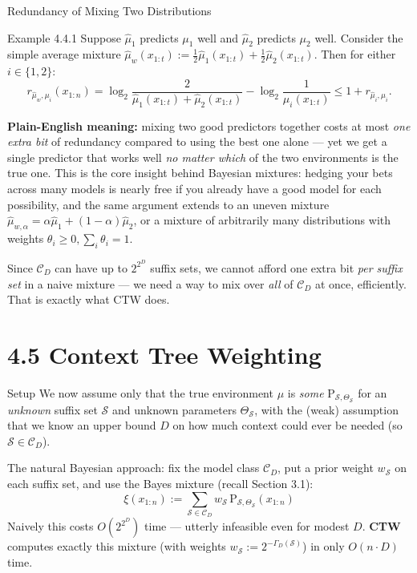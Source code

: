 \documentclass[aspectratio=169,10pt]{beamer}
\begin{document}
\begin{frame}{Redundancy of Mixing Two Distributions}
\begin{exampleblock}{Example 4.4.1}
Suppose $\hat\mu_1$ predicts $\mu_1$ well and $\hat\mu_2$ predicts $\mu_2$ well. Consider
the simple average mixture $\hat\mu_w(x_{1:t}):=\tfrac12\hat\mu_1(x_{1:t})+\tfrac12\hat\mu_2(x_{1:t})$.
Then for either $i\in\{1,2\}$:
$$
r_{\hat\mu_w,\mu_i}(x_{1:n}) = \log_2\frac{2}{\hat\mu_1(x_{1:t})+\hat\mu_2(x_{1:t})} -
\log_2\frac{1}{\mu_i(x_{1:t})} \le 1 + r_{\hat\mu_i,\mu_i}.
$$
\end{exampleblock}
\textbf{Plain-English meaning:} mixing two good predictors together costs at most \emph{one
extra bit} of redundancy compared to using the best one alone — yet we get a single
predictor that works well \emph{no matter which} of the two environments is the true one.
This is the core insight behind Bayesian mixtures: hedging your bets across many models is
nearly free if you already have a good model for each possibility, and the same argument
extends to an uneven mixture $\hat\mu_{w,\alpha}=\alpha\hat\mu_1+(1-\alpha)\hat\mu_2$, or a
mixture of arbitrarily many distributions with weights $\theta_i\ge0,\sum_i\theta_i=1$.

\vspace{0.2cm}
Since $\mathcal C_D$ can have up to $2^{2^D}$ suffix sets, we cannot afford one extra bit
\emph{per suffix set} in a naive mixture — we need a way to mix over \emph{all} of
$\mathcal C_D$ at once, efficiently. That is exactly what CTW does.
\end{frame}

\section{4.5 Context Tree Weighting}

\begin{frame}{Setup}
We now assume only that the true environment $\mu$ is \emph{some} $\mathrm{P}_{\mathcal
S,\Theta_{\mathcal S}}$ for an \emph{unknown} suffix set $\mathcal S$ and unknown parameters
$\Theta_{\mathcal S}$, with the (weak) assumption that we know an upper bound $D$ on how
much context could ever be needed (so $\mathcal S\in\mathcal C_D$).

The natural Bayesian approach: fix the model class $\mathcal C_D$, put a prior weight
$w_{\mathcal S}$ on each suffix set, and use the Bayes mixture (recall Section 3.1):
$$
\xi(x_{1:n}) := \sum_{\mathcal S\in\mathcal C_D} w_{\mathcal S}\,\mathrm{P}_{\mathcal
S,\Theta_{\mathcal S}}(x_{1:n})
$$
Naively this costs $O(2^{2^D})$ time — utterly infeasible even for modest $D$. \textbf{CTW}
computes exactly this mixture (with weights $w_{\mathcal S}:=2^{-\Gamma_D(\mathcal S)}$) in
only $O(n\cdot D)$ time.
\end{frame}
\end{document}
